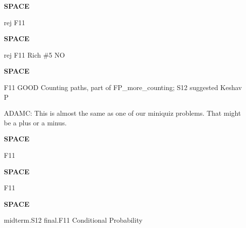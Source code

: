 \documentclass[quiz]{mcs}
\renewcommand{\examspace}{\textbf{SPACE}}
\begin{document}


\examspace
\begin{editingnotes}rej F11\end{editingnotes}

\examspace
\begin{editingnotes}rej F11 Rich \#5 NO\end{editingnotes}


\examspace 
\begin{editingnotes}
F11 GOOD Counting paths, part of FP\_more\_counting; S12 suggested
Keshav P

ADAMC: This is almost the same as one of our miniquiz problems.  That
might be a plus or a minus.
\end{editingnotes}


\iffalse
\examspace  %
GOOD \pinput[points = 10, title =
  \textbf{combinatorial binomial}]{FP_combinatorial_binomial}
\fi

\examspace
\begin{editingnotes}F11\end{editingnotes}


\examspace
\begin{editingnotes}F11\end{editingnotes}


\iffalse

\exampsace %
\pinput[points = 6, title =
  \textbf{towers of Sheboygan}]{FP_towers_of_Sheboygan}

\examspace  %
\pinput[points=6, title =
  \textbf{college probability}]{FP_college_probability}
\fi

\examspace
\begin{editingnotes}midterm.S12 final.F11 Conditional Probability \end{editingnotes}
\end{document}

